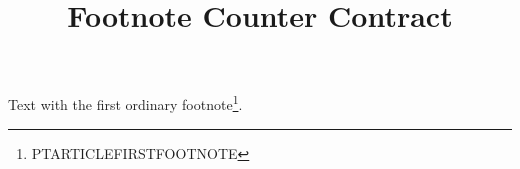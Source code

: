 \documentclass[nominted]{pt-article}
\title{Footnote Counter Contract}
\begin{document}
Text with the first ordinary footnote\footnote{PTARTICLEFIRSTFOOTNOTE}.
\makeatletter
{}
\makeatother
\end{document}
